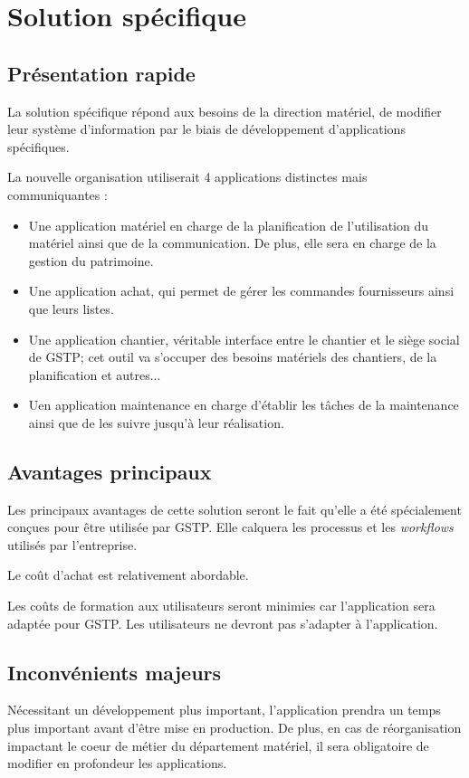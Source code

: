 \section{Solution spécifique}

\subsection{Présentation rapide}

La solution spécifique répond aux besoins de la direction matériel, de modifier
leur système d'information par le biais de développement d'applications spécifiques.

La nouvelle organisation utiliserait 4 applications distinctes mais communiquantes : 
\begin{itemize}
\item Une application matériel en charge de la planification de l'utilisation du 
matériel ainsi que de la communication. De plus, elle sera en charge de la gestion du 
patrimoine.
\item Une application achat, qui permet de gérer les commandes fournisseurs ainsi que
leurs listes.
\item Une application chantier, véritable interface entre le chantier et le siège 
social de GSTP; cet outil va s'occuper des besoins matériels des chantiers, de la planification et autres...
\item Uen application maintenance en charge d'établir les tâches de la maintenance ainsi que de les suivre 
jusqu'à leur réalisation.
\end{itemize}

\subsection{Avantages principaux}

Les principaux avantages de cette solution seront le fait qu'elle a été spécialement
conçues pour être utilisée par GSTP. Elle calquera les processus et les {\sl workflows}
utilisés par l'entreprise.

Le coût d'achat est relativement abordable.

Les coûts de formation aux utilisateurs seront minimies car l'application sera 
adaptée pour GSTP. Les utilisateurs ne devront pas s'adapter à l'application.

\subsection{Inconvénients majeurs}

Nécessitant un développement plus important, l'application prendra un temps
plus important avant d'être mise en production. De plus, en cas de réorganisation
impactant le coeur de métier du département matériel, il sera obligatoire de modifier
en profondeur les applications. 

